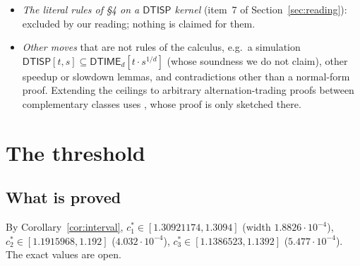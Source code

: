 \documentclass[11pt]{article}
\theoremstyle{definition}
\newcommand{\DTIME}{\mathsf{DTIME}}
\newcommand{\DTISP}{\mathsf{DTISP}}
\begin{document}
\begin{itemize}
\item \emph{The literal rules of \S4 on a $\DTISP$ kernel} (item~7 of Section~\ref{sec:reading}): excluded by our reading; nothing is claimed for them.
\item \emph{Other moves} that are not rules of the calculus, e.g.\ a simulation $\DTISP[t,s]\subseteq\DTIME_d[t\cdot s^{1/d}]$ (whose soundness we do not claim), other speedup or slowdown lemmas, and contradictions other than a normal-form proof. Extending the ceilings to arbitrary alternation-trading proofs between complementary classes uses \cite[Theorem~7.4]{W13}, whose proof is only sketched there.
\end{itemize}

\section{The threshold}\label{sec:threshold}

\subsection{What is proved}
By Corollary~\ref{cor:interval}, $c^*_1\in[1.30921174,1.3094]$ (width $1.8826\cdot10^{-4}$), $c^*_2\in[1.1915968,1.192]$ ($4.032\cdot10^{-4}$), $c^*_3\in[1.1386523,1.1392]$ ($5.477\cdot10^{-4}$). The exact values are open.
\end{document}
